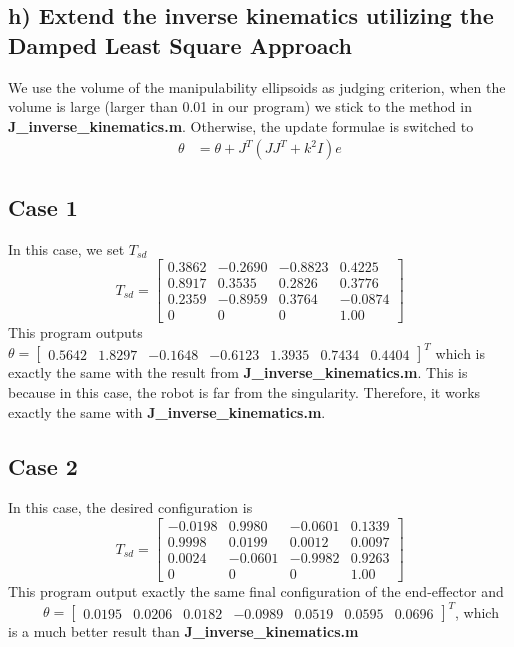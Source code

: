 \documentclass[english,10pt,a4paper]{article}
\begin{document}
    \subsection*{h) Extend the inverse kinematics utilizing the Damped Least Square Approach}
    We use the volume of the manipulability ellipsoids as judging criterion, when the volume is large (larger than 0.01 in our program) we stick to the method in \textbf{J\_inverse\_kinematics.m}. Otherwise, the update formulae is switched to
    \begin{align}
        \theta &= \theta + J ^T ( J J^T + k^2 I) e 
    \end{align}
    
    \subsection*{Case 1}
    In this case, we set $T_{sd}$
    \begin{equation}
        T_{sd} = \begin{bmatrix}
            0.3862 & -0.2690 & -0.8823 & 0.4225\\
            0.8917 & 0.3535 & 0.2826 & 0.3776\\
            0.2359 & -0.8959 & 0.3764 &  -0.0874\\
            0 & 0 & 0 & 1.00
        \end{bmatrix}
    \end{equation}
    This program outputs \(\theta = \begin{bmatrix} 0.5642 & 1.8297 & -0.1648 & -0.6123 & 1.3935 & 0.7434 & 0.4404 \end{bmatrix}^T\) which is exactly the same with the result from \textbf{J\_inverse\_kinematics.m}. This is because in this case, the robot is far from the singularity. Therefore, it works exactly the same with \textbf{J\_inverse\_kinematics.m}.

    \subsection*{Case 2}
    In this case, the desired configuration is
    \begin{equation}
        T_{sd} = \begin{bmatrix}
            -0.0198 & 0.9980 & -0.0601 & 0.1339\\
            0.9998 & 0.0199 & 0.0012 & 0.0097\\
            0.0024 & -0.0601 & -0.9982 & 0.9263\\
            0 & 0 & 0 & 1.00
        \end{bmatrix}
    \end{equation}
    This program output exactly the same final configuration of the end-effector and \ \ \ \ \ \(\theta = \begin{bmatrix} 0.0195 & 0.0206 & 0.0182 & -0.0989 & 0.0519 & 0.0595 & 0.0696 \end{bmatrix}^T\), which is a much better result than \textbf{J\_inverse\_kinematics.m}
    \printbibliography
\end{document}

